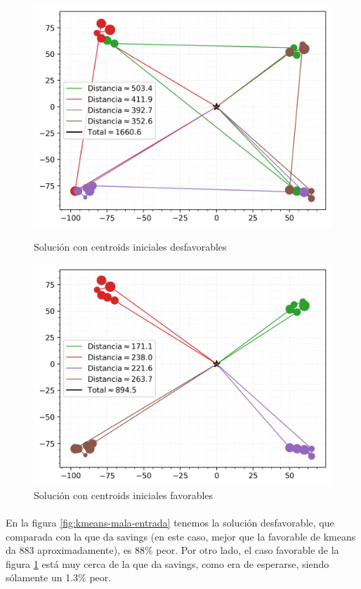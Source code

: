 \begin{figure}[H]
	\centering
	\begin{minipage}{0.38\textwidth}
		\centering
		\includegraphics[width=1\textwidth]{images/kmeans/nubemalodistancia}
		\caption{\footnotesize Solución con centroids iniciales desfavorables}
		\label{fig:kmeans-mala-entrada}
	\end{minipage}%
	\hspace{0.03\textwidth}
	\begin{minipage}{0.38\textwidth}
		\centering
		\includegraphics[width=1\textwidth]{images/kmeans/nubebuenodistancia}
		\caption{\footnotesize Solución con centroids iniciales favorables}
		\label{fig:kmeans-buena-entrada}
	\end{minipage}%
\end{figure}
\paragraph{}
En la figura \ref{fig:kmeans-mala-entrada} tenemos la solución desfavorable, que comparada con la que da savings (en este caso, mejor que la favorable de kmeans da 883 aproximadamente), es 88\% peor. Por otro lado, el caso favorable de la figura \ref{fig:kmeans-buena-entrada} está muy cerca de la que da savings, como era de esperarse, siendo sólamente un 1.3\% peor.



